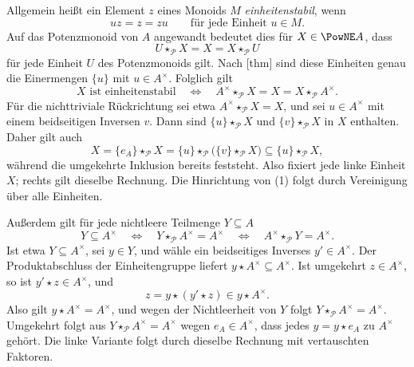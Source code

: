 \documentclass[main.tex]{subfiles}
\begin{document}
Allgemein heißt ein Element \(z\) eines Monoids \(M\)
\emph{einheitenstabil}, wenn
\[
  uz=z=zu
  \qquad\text{für jede Einheit }u\in M.
\]
Auf das Potenzmonoid von \(A\) angewandt bedeutet dies für
\(X\in\PowNE A\), dass
\[
  U\star_{\mathcal P}X=X=X\star_{\mathcal P}U
\]
für jede Einheit \(U\) des Potenzmonoids gilt.  Nach
[thm] sind diese Einheiten
genau die Einermengen \(\{u\}\) mit \(u\in A^\times\).  Folglich gilt
\[
  X\text{ ist einheitenstabil}
  \quad\Longleftrightarrow\quad
  A^\times\star_{\mathcal P}X=X
  =X\star_{\mathcal P}A^\times.                 \tag{1}
\]
Für die nichttriviale Rückrichtung sei etwa
\(A^\times\star_{\mathcal P}X=X\), und sei \(u\in A^\times\) mit einem
beidseitigen Inversen \(v\).  Dann sind
\(\{u\}\star_{\mathcal P}X\) und
\(\{v\}\star_{\mathcal P}X\) in \(X\) enthalten.  Daher gilt auch
\[
  X=\{e_A\}\star_{\mathcal P}X
    =\{u\}\star_{\mathcal P}
       \bigl(\{v\}\star_{\mathcal P}X\bigr)
    \subseteq\{u\}\star_{\mathcal P}X,
\]
während die umgekehrte Inklusion bereits feststeht.  Also fixiert jede
linke Einheit \(X\); rechts gilt dieselbe Rechnung.  Die Hinrichtung von
(1) folgt durch Vereinigung über alle Einheiten.

Außerdem gilt für jede nichtleere Teilmenge \(Y\subseteq A\)
\[
  Y\subseteq A^\times
  \quad\Longleftrightarrow\quad
  Y\star_{\mathcal P}A^\times=A^\times
  \quad\Longleftrightarrow\quad
  A^\times\star_{\mathcal P}Y=A^\times.        \tag{2}
\]
Ist etwa \(Y\subseteq A^\times\), sei \(y\in Y\), und wähle ein
beidseitiges Inverses \(y'\in A^\times\).  Der Produktabschluss der
Einheitengruppe liefert
\(y\star A^\times\subseteq A^\times\).  Ist umgekehrt
\(z\in A^\times\), so ist \(y'\star z\in A^\times\), und
\[
  z=y\star(y'\star z)\in y\star A^\times.
\]
Also gilt \(y\star A^\times=A^\times\), und wegen der Nichtleerheit von
\(Y\) folgt
\(Y\star_{\mathcal P}A^\times=A^\times\).  Umgekehrt folgt aus
\(Y\star_{\mathcal P}A^\times=A^\times\) wegen \(e_A\in A^\times\), dass
jedes \(y=y\star e_A\) zu \(A^\times\) gehört.  Die linke Variante folgt
durch dieselbe Rechnung mit vertauschten Faktoren.
\end{document}
